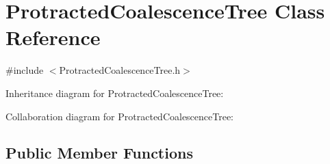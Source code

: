 \hypertarget{class_protracted_tree}{}\section{Protracted\+CoalescenceTree Class Reference}
\label{class_protracted_tree}


{\ttfamily \#include $<$Protracted\+CoalescenceTree.\+h$>$}



Inheritance diagram for Protracted\+CoalescenceTree\+:


Collaboration diagram for Protracted\+CoalescenceTree\+:
\subsection*{Public Member Functions}
